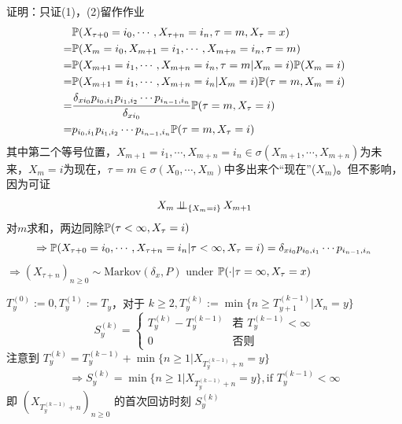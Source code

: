 证明：只证(1)，(2)留作作业
\[
\begin{aligned}
    &\mathbb{P}(X_{\tau+0}=i_0,\cdots,X_{\tau+n}=i_n,\tau=m,X_{\tau}=x)\\
    =&\mathbb{P}(X_m=i_0,X_{m+1}=i_1,\cdots,X_{m+n}=i_n,\tau=m)\\
    =&\mathbb{P}(X_{m+1}=i_1,\cdots,X_{m+n}=i_n,\tau=m|X_m=i)\mathbb{P}(X_m=i)\\
    =&\mathbb{P}(X_{m+1}=i_1,\cdots,X_{m+n}=i_n|X_m=i)\mathbb{P}(\tau=m,X_m=i)\\
    =&\frac{\delta_{xi_0}p_{i_0,i_1}p_{i_1,i_2}\cdots p_{i_{n-1},i_n}}{\delta_{xi_0}}\mathbb{P}(\tau=m,X_{\tau}=i)\\
    =&p_{i_0,i_1}p_{i_1,i_2}\cdots p_{i_{n-1},i_n}\mathbb{P}(\tau=m,X_{\tau}=i)
\end{aligned}
\]
其中第二个等号位置，$X_{m+1}=i_1,\cdots,X_{m+n}=i_n\in \sigma(X_{m+1},\cdots,X_{m+n})$为未来，$X_m=i$为现在，$\tau=m\in \sigma(X_0,\cdots,X_m)$中多出来个“现在”($X_m$)。但不影响，因为可证
\[
X_m\operatorname{\perp\!\!\!\perp}_{\{X_m=i\}}X_{m+1}
\]
对$m$求和，两边同除$\mathbb{P}(\tau<\infty,X_{\tau}=i)$
\[
\Rightarrow \mathbb{P}(X_{\tau+0}=i_0,\cdots,X_{\tau+n}=i_n|\tau<\infty,X_{\tau}=i)=\delta_{xi_0}p_{i_0,i_1}\cdots p_{i_{n-1},i_n}
\]
$\Rightarrow (X_{\tau+n})_{n\geq 0}\sim\text{Markov}(\delta_x,P)$ under $\mathbb{P}(\cdot|\tau=\infty,X_{\tau}=x)$

$T_y^{(0)}:=0, T_y^{(1)}:=T_y$，对于 $k\geq 2, T_y^{(k)}:=\min\{n\geq T_{y+1}^{(k-1)}|X_n=y\}$
\[
S_y^{(k)}=\begin{cases}
    T_y^{(k)}-T_y^{(k-1)}&\text{若 }T_y^{(k-1)}<\infty\\
    0 & \text{否则}
\end{cases}
\]
注意到 $T_y^{(k)}=T_y^{(k-1)}+\min\{n\geq 1|X_{T_y^{(k-1)}+n}=y\}$
\[
\Rightarrow S_y^{(k)}=\min\{n\geq 1|X_{T_y^{(k-1)}+n}=y\}, \text{if }T_y^{(k-1)}<\infty
\]
即 $(X_{T_y^{(k-1)}+n})_{n\geq 0}$ 的首次回访时刻 $S_y^{(k)}$
